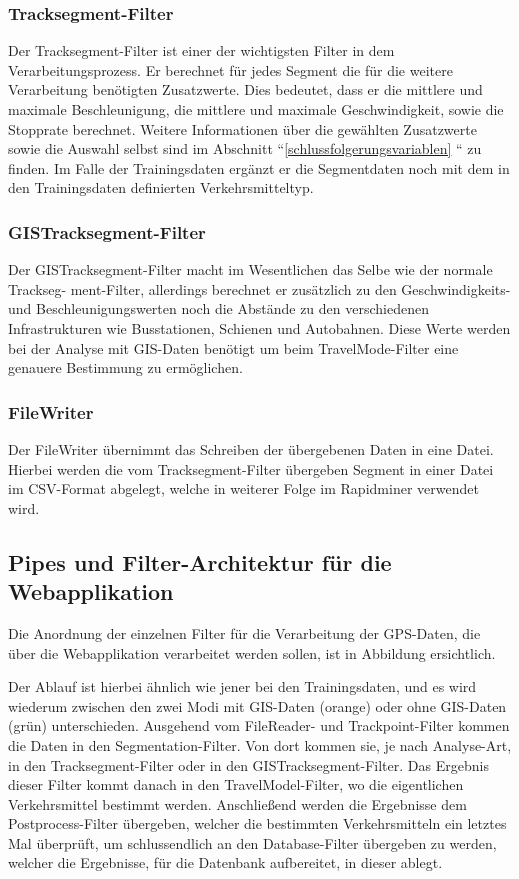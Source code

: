 \subsubsection{Tracksegment-Filter}
\label{tracksegmentFilter}
Der Tracksegment-Filter ist einer der wichtigsten Filter in dem Verarbeitungsprozess. Er berechnet für jedes Segment die für die weitere Verarbeitung benötigten Zusatzwerte. Dies bedeutet, dass er die mittlere und maximale Beschleunigung, die mittlere und maximale Geschwindigkeit, sowie die Stopprate berechnet. Weitere Informationen über die gewählten Zusatzwerte sowie die Auswahl selbst sind im Abschnitt ``\ref{schlussfolgerungsvariablen} `` zu finden.  Im Falle der Trainingsdaten ergänzt er die Segmentdaten noch mit dem in den Trainingsdaten definierten Verkehrsmitteltyp.

\subsubsection{GISTracksegment-Filter}
\label{gisTracksegmentFilter}
Der GISTracksegment-Filter macht im Wesentlichen das Selbe wie der normale Trackseg- ment-Filter, allerdings berechnet er zusätzlich zu den Geschwindigkeits- und Beschleunigungswerten noch die Abstände zu den verschiedenen Infrastrukturen wie Busstationen, Schienen und Autobahnen. Diese Werte werden bei der Analyse mit GIS-Daten benötigt um beim TravelMode-Filter eine genauere Bestimmung zu ermöglichen.

\subsubsection{FileWriter}
Der FileWriter übernimmt das Schreiben der übergebenen Daten in eine Datei. Hierbei werden die vom Tracksegment-Filter übergeben Segment in einer Datei im CSV-Format abgelegt, welche in weiterer Folge im Rapidminer verwendet wird.

\subsection{Pipes und Filter-Architektur für die Webapplikation}
Die Anordnung der einzelnen Filter für die Verarbeitung der GPS-Daten, die über die Webapplikation verarbeitet werden sollen, ist in Abbildung  ersichtlich. 

Der Ablauf ist hierbei ähnlich wie jener bei den Trainingsdaten, und es wird wiederum zwischen den zwei Modi mit GIS-Daten (orange) oder ohne GIS-Daten (grün) unterschieden. Ausgehend vom FileReader- und Trackpoint-Filter kommen die Daten in den Segmentation-Filter. Von dort kommen sie, je nach Analyse-Art, in den Tracksegment-Filter oder in den GISTracksegment-Filter. Das Ergebnis dieser Filter kommt danach in den TravelModel-Filter, wo die eigentlichen Verkehrsmittel bestimmt werden. Anschließend werden die Ergebnisse dem Postprocess-Filter übergeben, welcher die bestimmten Verkehrsmitteln ein letztes Mal überprüft, um schlussendlich an den Database-Filter übergeben zu werden, welcher die Ergebnisse, für die Datenbank aufbereitet, in dieser ablegt.


